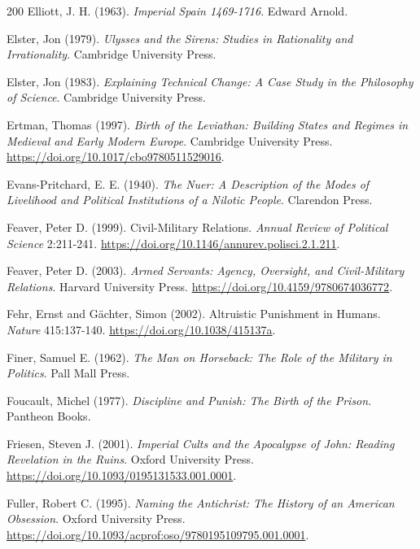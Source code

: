 \documentclass[11pt,letterpaper]{article}
\theoremstyle{definition}
\theoremstyle{remark}
\begin{document}
\begin{thebibliography}{200}
Elliott, J. H. (1963). \emph{Imperial Spain 1469-1716}. Edward Arnold.

Elster, Jon (1979). \emph{Ulysses and the Sirens: Studies in Rationality and Irrationality}. Cambridge University Press.

Elster, Jon (1983). \emph{Explaining Technical Change: A Case Study in the Philosophy of Science}. Cambridge University Press.

Ertman, Thomas (1997). \emph{Birth of the Leviathan: Building States and Regimes in Medieval and Early Modern Europe}. Cambridge University Press. \url{https://doi.org/10.1017/cbo9780511529016}.

Evans-Pritchard, E. E. (1940). \emph{The Nuer: A Description of the Modes of Livelihood and Political Institutions of a Nilotic People}. Clarendon Press.

Feaver, Peter D. (1999). Civil-Military Relations. \emph{Annual Review of Political Science} 2:211-241. \url{https://doi.org/10.1146/annurev.polisci.2.1.211}.

Feaver, Peter D. (2003). \emph{Armed Servants: Agency, Oversight, and Civil-Military Relations}. Harvard University Press. \url{https://doi.org/10.4159/9780674036772}.

Fehr, Ernst and G\"achter, Simon (2002). Altruistic Punishment in Humans. \emph{Nature} 415:137-140. \url{https://doi.org/10.1038/415137a}.

Finer, Samuel E. (1962). \emph{The Man on Horseback: The Role of the Military in Politics}. Pall Mall Press.

Foucault, Michel (1977). \emph{Discipline and Punish: The Birth of the Prison}. Pantheon Books.

Friesen, Steven J. (2001). \emph{Imperial Cults and the Apocalypse of John: Reading Revelation in the Ruins}. Oxford University Press. \url{https://doi.org/10.1093/0195131533.001.0001}.

Fuller, Robert C. (1995). \emph{Naming the Antichrist: The History of an American Obsession}. Oxford University Press. \url{https://doi.org/10.1093/acprof:oso/9780195109795.001.0001}.


\end{thebibliography}
\end{document}
